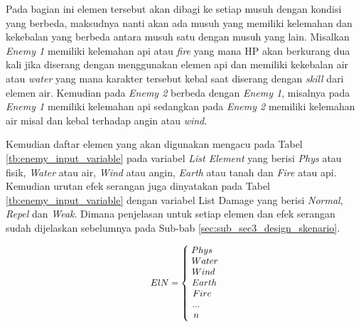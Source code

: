 Pada bagian ini elemen tersebut akan dibagi ke setiap musuh dengan kondisi yang berbeda, maksudnya nanti akan ada musuh yang memiliki kelemahan dan kekebalan yang berbeda antara musuh satu dengan musuh yang lain. Misalkan \textit{Enemy 1} memiliki kelemahan api atau \textit{fire} yang mana HP akan berkurang dua kali jika diserang dengan menggunakan elemen api dan memiliki kekebalan air atau \textit{water} yang mana karakter tersebut kebal saat diserang dengan \textit{skill} dari elemen air. Kemudian pada \textit{Enemy 2} berbeda dengan \textit{Enemy 1}, misalnya pada \textit{Enemy 1} memiliki kelemahan api sedangkan pada \textit{Enemy 2} memiliki kelemahan air misal dan kebal terhadap angin atau \textit{wind}. 
\vspace{1ex}

Kemudian daftar elemen yang akan digunakan mengacu pada Tabel \ref{tb:enemy_input_variable} pada variabel \textit{List Element} yang berisi \textit{Phys} atau fisik, \textit{Water} atau air, \textit{Wind} atau angin, \textit{Earth} atau tanah dan \textit{Fire} atau api. Kemudian urutan efek serangan juga dinyatakan pada Tabel \ref{tb:enemy_input_variable} dengan variabel List Damage yang berisi \textit{Normal}, \textit{Repel} dan \textit{Weak}. Dimana penjelasan untuk setiap elemen dan efek serangan sudah dijelaskan sebelumnya pada Sub-bab \ref{sec:sub_sec3_design_skenario}.

\begin{equation}\label{eq:enemy_element}
\resizebox{0.20\textwidth}{!}{%
	$ElN = \left\{\begin{matrix}
	\hspace{-0.34em} Phys \\ 
	\hspace{0.3em} Water \\
	\hspace{0.0em} Wind \\
	\hspace{0.2em} Earth \\
	\hspace{-0.3em} Fire \\
	\hspace{-1.6em} ... \\
	\hspace{-1.6em} n
	\end{matrix}\right.$%
}
\end{equation}

